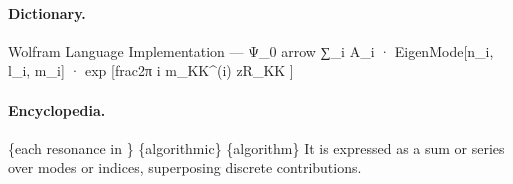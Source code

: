 \paragraph{Dictionary.}
Wolfram Language Implementation — Ψ\_0 arrow ∑\_i A\_i · EigenMode[n\_i, l\_i, m\_i] · exp [frac2π i m\_KK\textasciicircum{}(i) zR\_KK ]

\paragraph{Encyclopedia.}
\{each resonance in \} \{algorithmic\} \{algorithm\} It is expressed as a sum or series over modes or indices, superposing discrete contributions.
